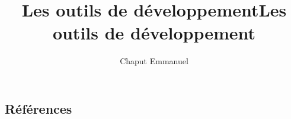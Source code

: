 \documentclass{article}
\title{Les outils de développement}
\author{Chaput Emmanuel}
\title{Les outils de développement}
\begin{document}


\subsection{Références}

\printbibliography
\end{document}
